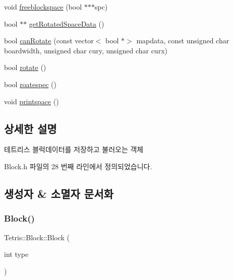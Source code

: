 \begin{DoxyCompactItemize}
\item 
void \hyperlink{class_tetris_1_1_block_aea78e0a1b229842f541a8e897e2e9340}{freeblockspace} (bool $\ast$$\ast$$\ast$spc)
\item 
bool $\ast$$\ast$ \hyperlink{class_tetris_1_1_block_ada769278572785b24e8a91f620b97b81}{get\+Rotated\+Space\+Data} ()
\item 
bool \hyperlink{class_tetris_1_1_block_a56d194d0a5d56d2d1220ec32774cea38}{can\+Rotate} (const vector$<$ bool $\ast$$>$ mapdata, const unsigned char boardwidth, unsigned char cury, unsigned char curx)
\item 
bool \hyperlink{class_tetris_1_1_block_a0d1eb57e6da91832ad983f7a4fa9ca04}{rotate} ()
\item 
bool \hyperlink{class_tetris_1_1_block_a787424e5e9ec2807989121e8dcee1a7a}{roatespec} ()
\item 
void \hyperlink{class_tetris_1_1_block_ae7aadeec449fec232e9635d839593028}{printspace} ()
\end{DoxyCompactItemize}


\subsection{상세한 설명}
테트리스 블럭데이터를 저장하고 불러오는 객체 

Block.\+h 파일의 28 번째 라인에서 정의되었습니다.



\subsection{생성자 \& 소멸자 문서화}
\mbox{\label{class_tetris_1_1_block_a1fd0aaff1f4b622c9c7027929c5d4534}} 
\subsubsection{\texorpdfstring{Block()}{Block()}\hspace{0.1cm}{\footnotesize\ttfamily [1/4]}}
{\footnotesize\ttfamily Tetris\+::\+Block\+::\+Block (\begin{DoxyParamCaption}\item[{int}]{type }\end{DoxyParamCaption})\hspace{0.3cm}{\ttfamily [inline]}}



